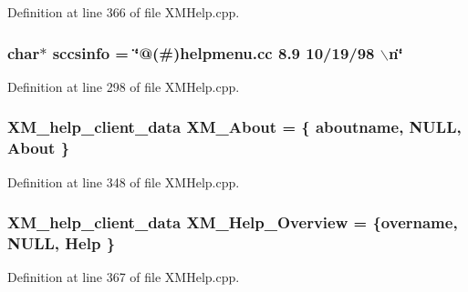 Definition at line 366 of file XMHelp.cpp.
\subsubsection{\setlength{\rightskip}{0pt plus 5cm}char$\ast$ sccsinfo = \char`\"{}@(\#)helpmenu.cc 8.9 10/19/98 $\backslash$n\char`\"{}\hspace{0.3cm}{\tt  [static]}}\label{XMHelp_8cpp_a1}




Definition at line 298 of file XMHelp.cpp.
\subsubsection{\setlength{\rightskip}{0pt plus 5cm}XM\_\-help\_\-client\_\-data XM\_\-About = \{ {\bf aboutname}, NULL, {\bf About} \}}\label{XMHelp_8cpp_a4}




Definition at line 348 of file XMHelp.cpp.
\subsubsection{\setlength{\rightskip}{0pt plus 5cm}XM\_\-help\_\-client\_\-data XM\_\-Help\_\-Overview = \{{\bf overname}, NULL, {\bf Help} \}}\label{XMHelp_8cpp_a7}




Definition at line 367 of file XMHelp.cpp.